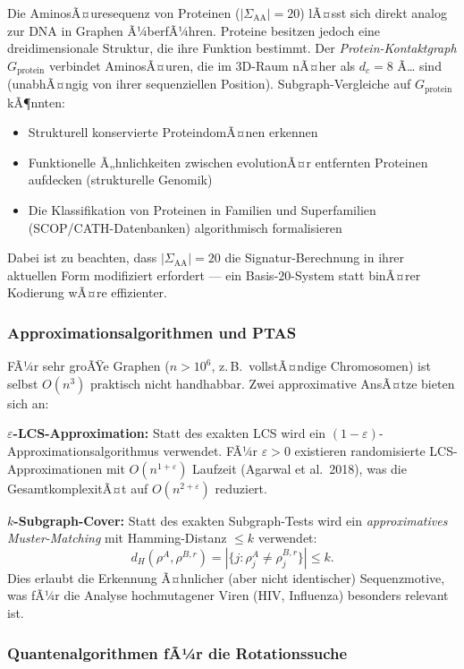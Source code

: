 ﻿\documentclass[a4paper,12pt]{article}
\theoremstyle{definition}
\begin{document}
Die AminosÃ¤uresequenz von Proteinen ($|\Sigma_{\text{AA}}| = 20$) lÃ¤sst sich
direkt analog zur DNA in Graphen Ã¼berfÃ¼hren. Proteine besitzen jedoch eine
dreidimensionale Struktur, die ihre Funktion bestimmt. Der
\textit{Protein-Kontaktgraph} $G_{\text{protein}}$ verbindet AminosÃ¤uren,
die im 3D-Raum nÃ¤her als $d_c = 8$ Ã… sind (unabhÃ¤ngig von ihrer sequenziellen
Position). Subgraph-Vergleiche auf $G_{\text{protein}}$ kÃ¶nnten:
\begin{itemize}
	\item Strukturell konservierte ProteindomÃ¤nen erkennen
	\item Funktionelle Ã„hnlichkeiten zwischen evolutionÃ¤r entfernten Proteinen
	aufdecken (strukturelle Genomik)
	\item Die Klassifikation von Proteinen in Familien und Superfamilien
	(SCOP/CATH-Datenbanken) algorithmisch formalisieren
\end{itemize}
Dabei ist zu beachten, dass $|\Sigma_{\text{AA}}| = 20$ die
Signatur-Berechnung in ihrer aktuellen Form modifiziert erfordert ---
ein Basis-$20$-System statt binÃ¤rer Kodierung wÃ¤re effizienter.

\subsubsection{Approximationsalgorithmen und PTAS}

FÃ¼r sehr groÃŸe Graphen ($n > 10^6$, z.\,B.\ vollstÃ¤ndige Chromosomen) ist
selbst $O(n^3)$ praktisch nicht handhabbar. Zwei approximative AnsÃ¤tze
bieten sich an:

\textbf{$\varepsilon$-LCS-Approximation:} Statt des exakten LCS wird ein
$(1-\varepsilon)$-Approximationsalgo\-rithmus verwendet. FÃ¼r $\varepsilon > 0$
existieren randomisierte LCS-Approximationen mit $O(n^{1+\varepsilon})$
Laufzeit (Agarwal et al.\ 2018), was die GesamtkomplexitÃ¤t auf
$O(n^{2+\varepsilon})$ reduziert.

\textbf{$k$-Subgraph-Cover:} Statt des exakten Subgraph-Tests wird ein
\textit{approximatives Muster-Matching} mit Hamming-Distanz $\leq k$ verwendet:
\[
d_H(\rho^A, \rho^{B,r}) = |\{j : \rho_j^A \neq \rho_j^{B,r}\}| \leq k.
\]
Dies erlaubt die Erkennung Ã¤hnlicher (aber nicht identischer) Sequenzmotive,
was fÃ¼r die Analyse hochmutagener Viren (HIV, Influenza) besonders relevant ist.

\subsubsection{Quantenalgorithmen fÃ¼r die Rotationssuche}
\end{document}
